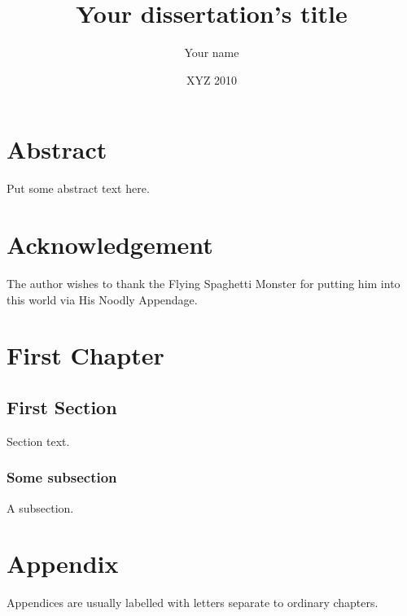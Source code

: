 \documentclass[10pt,oneside]{book}
\begin{document}
\title{Your dissertation's title}
\author{Your name}
\date{XYZ 2010}
\maketitle 
\frontmatter

\chapter{Abstract}

Put some abstract text here.

\tableofcontents



\listoffigures





\chapter{Acknowledgement}

The author wishes to thank the Flying Spaghetti Monster for putting him into this world via His Noodly Appendage.


\printglossary



\mainmatter

\chapter{First Chapter}
\section{First Section}

Section text.

\subsection{Some subsection}

A subsection.



\appendix
\chapter{Appendix}
Appendices are usually labelled with letters separate to ordinary chapters.


\singlespacing



\printindex
{}
\end{document}
